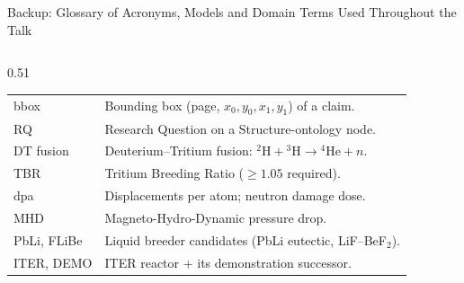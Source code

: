\documentclass[aspectratio=169, 11pt]{beamer}
\begin{document}
\begin{frame}[shrink=55]{Backup: Glossary of Acronyms, Models and Domain Terms Used Throughout the Talk}
\begin{columns}[T]
\begin{column}{0.51\textwidth}
\begin{tabular}{@{}p{2.0cm}p{5.4cm}@{}}
    bbox      & Bounding box (page, $x_0,y_0,x_1,y_1$) of a claim.\\
    RQ        & Research Question on a Structure-ontology node.\\
    DT fusion & Deuterium--Tritium fusion: $^2\mathrm{H}{+}{}^3\mathrm{H}\!\to\!{}^4\mathrm{He}{+}n$.\\
    TBR       & Tritium Breeding Ratio ($\geq 1.05$ required).\\
    dpa       & Displacements per atom; neutron damage dose.\\
    MHD       & Magneto-Hydro-Dynamic pressure drop.\\
    PbLi, FLiBe & Liquid breeder candidates (PbLi eutectic, LiF--BeF$_2$).\\
    ITER, DEMO & ITER reactor + its demonstration successor.\\
    \bottomrule
    \end{tabular}
  \end{column}
\end{columns}
\end{frame}
\end{document}

